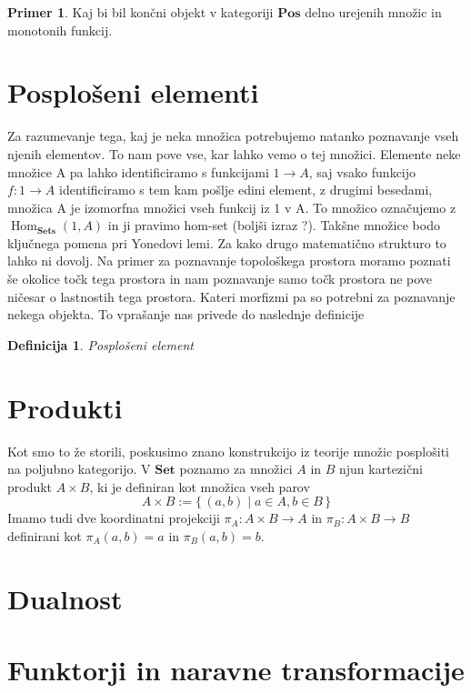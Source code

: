 \documentclass[12pt,a4paper]{book}
\theoremstyle{definition}
\newtheorem{definicija}{Definicija}[chapter]
\theoremstyle{plain}
\theoremstyle{definition}
\newtheorem{primer}{Primer}[section]
\theoremstyle{remark}
\newcommand{\cat}[1]{\textbf{#1}}
\DeclareMathOperator{\Hom}{Hom}
\newcommand{\set}[1]{\{\,#1\,\}}
\begin{document}

\begin{primer}
Kaj bi bil končni objekt v kategoriji $\cat{Pos}$ delno urejenih množic in monotonih funkcij. 
\end{primer}

\section{Posplošeni elementi}
Za razumevanje tega, kaj je neka množica potrebujemo natanko poznavanje vseh njenih elementov. To nam pove vse, kar lahko vemo o tej množici. Elemente neke množice A pa lahko identificiramo s funkcijami $1 \to A$, saj vsako funkcijo $f : 1 \to A$ identificiramo s tem kam pošlje edini element, z drugimi besedami, množica A je izomorfna množici vseh funkcij iz 1 v A. To množico označujemo z $\Hom_{\cat{Sets}} (1,A)$ in ji pravimo hom-set (boljši izraz ?). Takšne množice bodo ključnega pomena pri Yonedovi lemi.
Za kako drugo matematično strukturo to lahko ni dovolj. Na primer za poznavanje topološkega prostora moramo poznati še okolice točk tega prostora in nam poznavanje samo točk prostora ne pove ničesar o lastnostih tega prostora. Kateri morfizmi pa so potrebni za poznavanje nekega objekta. To vprašanje nas privede do naslednje definicije

\begin{definicija}
\textit{Posplošeni element}
\end{definicija}


\section{Produkti}
Kot smo to že storili, poskusimo znano konstrukcijo iz teorije množic posplošiti na poljubno kategorijo. V $\cat{Set}$ poznamo za množici $A$ in $B$ njun kartezični produkt $A \times B$, ki je definiran kot množica vseh parov 
$$A \times B := \set{(a,b) \mid a \in A, b \in B}$$
Imamo tudi dve koordinatni projekciji $\pi_A : A\times B \to A$ in $\pi_B : A \times B \to B$ definirani kot $\pi_A(a,b) = a$ in $\pi_B(a,b) = b$.

\section{Dualnost}


\section{Funktorji in naravne transformacije}
\end{document}
